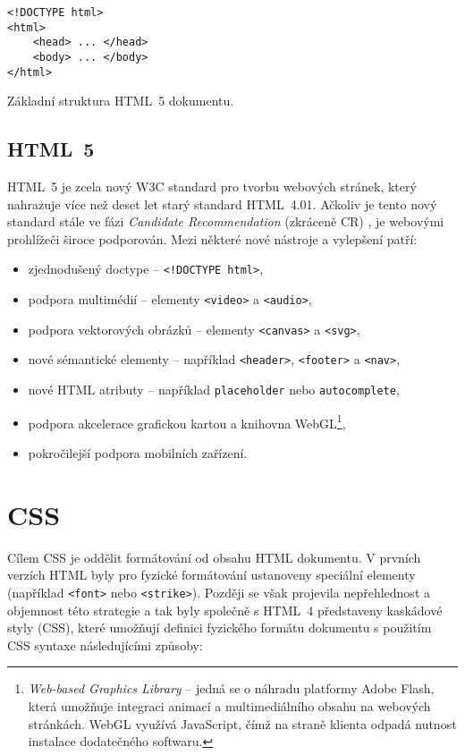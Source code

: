 \begin{example}
    \centering
    \begin{lstlisting}
<!DOCTYPE html>
<html>
    <head> ... </head>
    <body> ... </body>
</html>
    \end{lstlisting}
    \caption{Základní struktura HTML~5 dokumentu.}
    \label{example:html}
\end{example}

\subsection{HTML~5}

HTML~5 je zcela nový W3C standard pro tvorbu webových stránek, který nahrazuje více než deset let starý standard HTML~4.01. Ačkoliv je tento nový standard stále ve fázi \textit{Candidate Recommendation} (zkráceně CR) \cite{17}, je webovými prohlížeči široce podporován. Mezi některé nové nástroje a vylepšení patří:

\begin{itemize}
    \item zjednodušený doctype -- \texttt{<!DOCTYPE html>},
    \item podpora multimédií -- elementy \texttt{<video>} a \texttt{<audio>},
    \item podpora vektorových obrázků -- elementy \texttt{<canvas>} a \texttt{<svg>},
    \item nové sémantické elementy -- například \texttt{<header>}, \texttt{<footer>} a \texttt{<nav>},
    \item nové HTML atributy -- například \texttt{placeholder} nebo \texttt{autocomplete},
    \item podpora akcelerace grafickou kartou a knihovna WebGL\footnote{\textit{Web-based Graphics Library} -- jedná se o náhradu platformy Adobe Flash, která umožňuje integraci animací a multimediálního obsahu na webových stránkách. WebGL využívá JavaScript, čímž na straně klienta odpadá nutnost instalace dodatečného softwaru.},
    \item pokročilejší podpora mobilních zařízení.
\end{itemize}

\section{CSS}
\label{sec:css}

Cílem CSS je oddělit formátování od obsahu HTML dokumentu. V prvních verzích HTML byly pro fyzické formátování ustanoveny speciální elementy (například \texttt{<font>} nebo \texttt{<strike>}). Později se však projevila nepřehlednost a objemnost této strategie a tak byly společně s HTML~4 představeny kaskádové styly (CSS), které umožňují definici fyzického formátu dokumentu s použitím CSS syntaxe následujícími způsoby:

